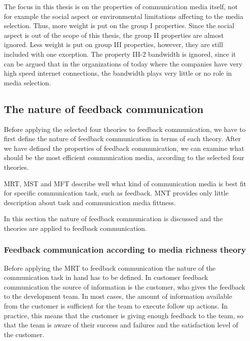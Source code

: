 \documentclass[english,12pt,a4paper,pdftex]{article}
\begin{document}
The focus in this thesis is on the properties of communication media itself, not for example the social aspect or environmental limitations affecting to the media selection. Thus, more weight is put on the group I properties. Since the social aspect is out of the scope of this thesis, the group II properties are almost ignored. Less weight is put on group III properties, however, they are still included with one exception. The property III-2 bandwidth is ignored, since it can be argued that in the organizations of today where the companies have very high speed internet connections, the bandwidth plays very little or no role in media selection.

\subsection{The nature of feedback communication}

Before applying the selected four theories to feedback communication, we have to first define the nature of feedback communication in terms of each theory. After we have defined the properties of feedback communication, we can examine what should be the most efficient communication media, according to the selected four theories.

\Ac{MRT}, \ac{MST} and \ac{MFT} describe well what kind of communication media is best fit for specific communication task, such as feedback. \Ac{MNT} provides only little description about task and communication media fittness.

In this section the nature of feedback communication is discussed and the theories are applied to feedback communication.

\subsubsection{Feedback communication according to media richness theory}

Before applying the \ac{MRT} to feedback communication the nature of the communication task in hand has to be defined. In customer feedback communication the source of information is the customer, who gives the feedback to the development team. In most cases, the amount of information available from the customer is sufficient for the team to execute follow up actions. In practice, this means that the customer is giving enough feedback to the team, so that the team is aware of their success and failures and the satisfaction level of the customer.
\end{document}
